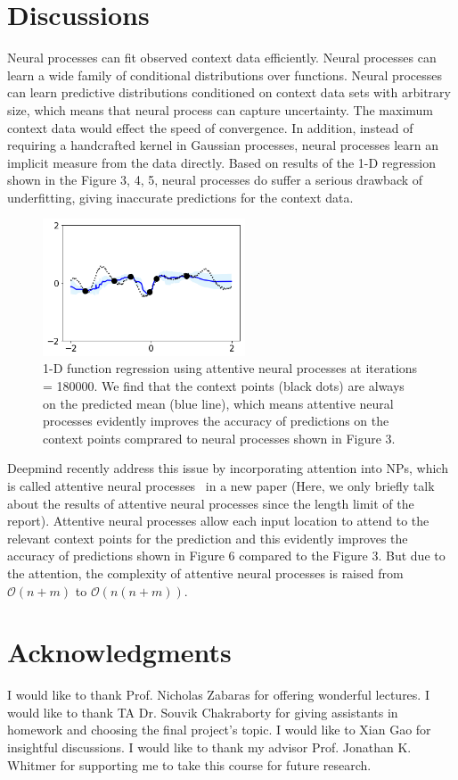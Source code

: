 \documentclass{article}
\begin{document}
\section{Discussions}
\label{discussions}
Neural processes can fit observed context data efficiently. Neural processes can learn a wide family of conditional distributions over functions. Neural processes can learn predictive distributions conditioned on context data sets with arbitrary size, which means that neural process can capture uncertainty. The maximum context data would effect the speed of convergence. In addition, instead of requiring a handcrafted kernel in Gaussian processes, neural processes learn an implicit measure from the data directly. Based on results of the 1-D regression shown in the Figure 3, 4, 5, neural processes do suffer a serious drawback of underfitting, giving inaccurate predictions for the context data. 

\begin{figure}[h!]
  \centering
  \includegraphics[width = 6cm]{ANP_1D_regression.png}
  \caption{1-D function regression using attentive neural processes at iterations = 180000. We find that the context points (black dots) are always on the predicted mean (blue line), which means attentive neural processes evidently improves the accuracy of predictions on the context points comprared to neural processes shown in Figure 3.}
\end{figure}

Deepmind recently address this issue by incorporating attention into NPs, which is called attentive neural processes~\cite{kim2019attentive} in a new paper (Here, we only briefly talk about the results of attentive neural processes since the length limit of the report). Attentive neural processes allow each input location to attend to the relevant context points for the prediction and this evidently improves the accuracy of predictions shown in Figure 6 compared to the Figure 3. But due to the attention, the complexity of attentive neural processes is raised from $\mathcal{O}(n+m)$ to $\mathcal{O}(n(n+m))$.

\section*{Acknowledgments}
I would like to thank Prof. Nicholas Zabaras for offering wonderful lectures. I would like to thank TA Dr. Souvik Chakraborty for giving assistants in homework and choosing the final project's topic. I would like to Xian Gao for insightful discussions. I would like to thank my advisor Prof. Jonathan K. Whitmer for supporting me to take this course for future research.



\let\bibhang\relax

\end{document}
